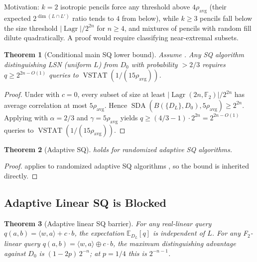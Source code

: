 \documentclass[11pt,a4paper]{article}
\theoremstyle{plain}
\newtheorem{theorem}{Theorem}[section]
\theoremstyle{definition}
\newcommand{\F}{\mathbb{F}}
\newcommand{\E}{\mathbb{E}}
\DeclareMathOperator{\Lagr}{Lagr}
\DeclareMathOperator{\SDA}{SDA}
\DeclareMathOperator{\VSTAT}{VSTAT}
\begin{document}
Motivation: $k=2$ isotropic pencils force any threshold above $4\rho_{\mathrm{avg}}$ (their expected $2^{\dim(L\cap L')}$ ratio tends to $4$ from below), while $k \geq 3$ pencils fall below the size threshold $|\Lagr|/2^{2n}$ for $n \geq 4$, and mixtures of pencils with random fill dilute quadratically. A proof would require classifying near-extremal subsets.

\begin{theorem}[Conditional main SQ lower bound]
\label{thm:main-sq-cond}
Assume . Any SQ algorithm distinguishing LSN (uniform $L$) from $D_0$ with probability $> 2/3$ requires $q \geq 2^{2n - O(1)}$ queries to $\VSTAT(1/(15\rho_{\mathrm{avg}}))$.
\end{theorem}

\begin{proof}
Under  with $c=0$, every subset of size at least $|\Lagr(2n,\F_2)| / 2^{2n}$ has average correlation at most $5\rho_{\mathrm{avg}}$. Hence $\SDA(B(\{D_L\},D_0), 5\rho_{\mathrm{avg}}) \geq 2^{2n}$. Applying  with $\alpha = 2/3$ and $\gamma = 5\rho_{\mathrm{avg}}$ yields $q \geq (4/3 - 1) \cdot 2^{2n} = 2^{2n - O(1)}$ queries to $\VSTAT(1/(15\rho_{\mathrm{avg}}))$.
\end{proof}

\begin{theorem}[Adaptive SQ]
 holds for randomized adaptive SQ algorithms.
\end{theorem}

\begin{proof}
 applies to randomized adaptive SQ algorithms \cite[Theorem 3.7]{FGR+17}, so the bound is inherited directly.
\end{proof}

\subsection{Adaptive Linear SQ is Blocked}
\label{subsec:adaptive-linear}

\begin{theorem}[Adaptive linear SQ barrier]
\label{thm:linear-sq}
For any real-linear query $q(a,b) = \langle w, a \rangle + c \cdot b$, the expectation $\E_{D_L}[q]$ is independent of $L$. For any F$_2$-linear query $q(a,b)=\langle w,a\rangle \oplus c\cdot b$, the maximum distinguishing advantage against $D_0$ is $(1-2p)\,2^{-n}$; at $p=1/4$ this is $2^{-n-1}$.
\end{theorem}
\end{document}
